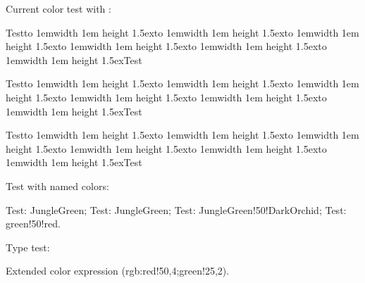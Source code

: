 \documentclass{article}
\begin{document}
\bigskip
Current color test with \texttt{\string{}}:\par
\color{blue}
\def\test{\hbox to 1em{{\color{foo!!+}\vrule width 1em height 1.5ex}}}
Test\test\test\test\test\test\test Test

\def\test{\hbox to 1em{{\color{foo!!++}\vrule width 1em height 1.5ex}}}
Test\test\test\test\test\test\test Test

\def\test{\hbox to 1em{{\color{foo!![2]}\vrule width 1em height 1.5ex}}}
Test\test\test\test\test\test\test Test

\bigskip
\color{black}
Test with named colors:\par
\color{blue}
Test: \textcolor[named]{JungleGreen}{JungleGreen};
Test: \textcolor{JungleGreen}{JungleGreen};
Test: \textcolor{JungleGreen!50!DarkOrchid}{JungleGreen!50!DarkOrchid};
Test: \textcolor{green!50!red}{green!50!red}.

Type test:
\makeatletter
{}\edef\tempa{}\tempa
{}\edef\tempb{}\tempb
{}\edef\tempc{}\tempc
{}\edef\tempd{}\tempd
\makeatother

\textcolor{rgb:red!50,4;green!25,2}{Extended color expression (rgb:red!50,4;green!25,2)}.
\end{document}
